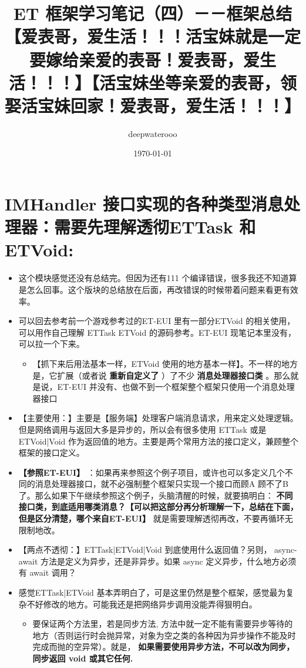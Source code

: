 \documentclass[9pt, b5paper]{article}
\author{deepwaterooo}
\date{\today}
\title{ET 框架学习笔记（四）－－框架总结【爱表哥，爱生活！！！活宝妹就是一定要嫁给亲爱的表哥！爱表哥，爱生活！！！】【活宝妹坐等亲爱的表哥，领娶活宝妹回家！爱表哥，爱生活！！！】}
\begin{document}
\maketitle
\tableofcontents


\section{IMHandler 接口实现的各种类型消息处理器：需要先理解透彻ETTask 和 ETVoid:}
\label{sec:orga8c3549}
\begin{itemize}
\item 这个模块感觉还没有总结完。但因为还有111 个编译错误，很多我还不知道算是怎么回事。这个版块的总结放在后面，再改错误的时候带着问题来看更有效率。
\item 可以回去参考前一个游戏参考过的ET-EUI 里有一部分ETVoid 的相关使用，可以用作自己理解 ETTask ETVoid 的源码参考。ET-EUI 现笔记本里没有，可以拉一个下来。
\begin{itemize}
\item 【抓下来后用法基本一样，ETVoid 使用的地方基本一样】。不一样的地方是，它扩展（或者说 \textbf{重新自定义了} ）了不少 \textbf{消息处理器接口类} 。那么就是说，ET-EUI 并没有、也做不到一个框架整个框架只使用一个消息处理器接口
\end{itemize}
\item 【主要使用：】主要是【服务端】处理客户端消息请求，用来定义处理逻辑。但是网络调用与返回大多是异步的，所以会有很多使用 ETTask 或是 ETVoid|Void 作为返回值的地方。主要是两个常用方法的接口定义，兼顾整个框架的接口定义。
\item \textbf{【参照ET-EUI】} ：如果再来参照这个例子项目，或许也可以多定义几个不同的消息处理器接口，就不必强制整个框架只实现一个接口而顾A 顾不了B 了。那么如果下午继续参照这个例子，头脑清醒的时候，就要搞明白： \textbf{不同接口类，到底适用哪类消息？【可以把这部分再分析理解一下，总结在下面，但是区分清楚，哪个来自ET-EUI】} 就是需要理解透彻再改，不要再循环无限制地改。
\item 【两点不透彻：】ETTask|ETVoid|Void 到底使用什么返回值？另则， async-await 方法是定义为异步，还是非异步。如果 async 定义异步，什么地方必须有 await 调用？
\item 感觉ETTask|ETVoid 基本弄明白了，可是这里仍然是整个框架，感觉最为复杂不好修改的地方。可能我还是把网络异步调用没能弄得狠明白。
\begin{itemize}
\item 要保证两个方法里，若是同步方法, 方法中就一定不能有需要异步等待的地方（否则运行时会抛异常，对象为空之类的各种因为异步操作不能及时完成而抛的空异常）。就是， \textbf{如果需要使用异步方法，不可以改为同步，同步返回 void 或其它任何.}

\end{itemize}
\end{itemize}
\end{document}
